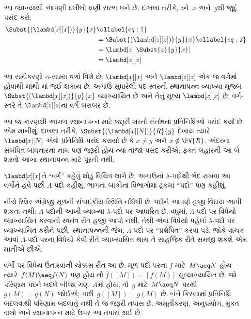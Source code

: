 \documentclass[../../../include/open-logic-section]{subfiles}
\begin{document}
આ વ્યાખ્યાથી આપણી દલીલો ઘણી સરળ બને છે. દાખલા તરીકે,
$z$ને~$x$ અને~$y$થી જુદું પસંદ કરો:
\begin{align}
  \Subst{(\lambd[x][x])}{y}{x} & \ollabel{eq:1}\\
  &= \Subst{(\lambd[z][z])}{y}{x} \ollabel{eq:2}\\
  &= \lambd[z][\Subst{z}{y}{x}] \\
  &= \lambd[z][z]
\end{align}

આ સમીકરણો $\alpha$-સામ્ય વર્ગો વિશે છે: $\lambd[x][x]$
અને $\lambd[z][z]$ એક જ વર્ગમાં હોવાથી
માંથી માં જઈ શકાય છે. અગાઉ
સુધારેલી પદ-સ્તરની સ્થાનાપન્ન-વ્યાખ્યા મુજબ
$\Subst{(\lambd[x][x])}{y}{x}$ વ્યાખ્યાયિત છે અને
તેનું મૂલ્ય $\lambd[x][x]$ છે; વર્ગ-સ્તરે તે
$\lambd[z][z]$ના વર્ગ બરાબર છે.

આ જ કારણથી આગળ સ્થાનાપન્ન માટે જરૂરી શરતો
સંતોષતા પ્રતિનિધિઓ પસંદ કર્યાં છે એમ માનીશું. દાખલા તરીકે,
$\Subst{(\lambd[x][N])}{R}{y}$ દેખાય ત્યારે
$\lambd[x][N]$ એવો પ્રતિનિધિ પસંદ કરાયો છે કે
$x \neq y$ અને $x \notin \FV{R}$. અંદરના સંબંધિત
બાંધનારનાં નામ પણ જરૂરી હોય ત્યાં તાજાં પસંદ કરીએ; ફક્ત
બહારની આ બે શરતો આખા સ્થાનાપન્ન માટે પૂરતી નથી.

$\lambd[x][x]$ને ``વર્ગ'' કહેવું થોડું વિચિત્ર લાગે છે.
અગાઉનાં $\lambda$-પદોથી ભેદ રાખવા આ વર્ગોને હવે પછી
$\Lambda$-પદો કહીશું; ભાગના બાકીના વિભાગોમાં ટૂંકમાં
``પદો'' પણ કહીશું.

\begin{editorial}
  નીચે સ્થિર અંગ્રેજી મૂળની સંપાદકીય સ્થિતિ નોંધેલી છે.
  પદોને આપણે હજી વિદાય આપી શકતા નથી: $\Lambda$-પદોની
  આખી વ્યાખ્યા $\lambda$-પદો પર આધારિત છે. વધુમાં,
  $\Lambda$-પદો પર વિધેયો વ્યાખ્યાયિત કરવાની સ્વતંત્ર
  રીત હજી આપી નથી. તેથી એવા વિધેયો પહેલાં
  $\lambda$-પદો પર વ્યાખ્યાયિત કરીને પછી, સ્થાનાપન્નની
  જેમ, $\Lambda$-પદો પર ``પ્રક્ષેપિત'' કરવા પડે.
  જોકે વાચક આવાં $\Lambda$-પદો પરના વિધેયો કેવી રીતે વ્યાખ્યાયિત થાય તે
  સાહજિક રીતે સમજી શકશે એમ માનીએ છીએ.
\end{editorial}

વર્ગો પર વિધેય ઉતારવાની ચોક્કસ રીત આ છે. મૂળ પદો પરના
$f$ માટે~$M\aeq N$ હોય ત્યારે~$f(M)\aeq f(N)$ પણ હોય તો
$\bar f([M])=[f(M)]$ સુવ્યાખ્યાયિત છે. જો પરિણામ પદને બદલે
બીજા ગણ~$A$માં હોય, તો~$g$ માટે~$M\aeq N$ પરથી
$g(M)=g(N)$ જોઈએ; પછી~$\bar g([M])=g(M)$ છે.
બંને કિસ્સામાં પ્રતિનિધિ બદલવાથી પરિણામ બદલાતું નથી તે જ
જરૂરી તપાસ છે. અમૂર્તીકરણ, અનુપ્રયોગ, મુક્ત ચલો અને
સ્થાનાપન્ન માટે ઉપર આ તપાસ થઈ છે.
\end{document}
